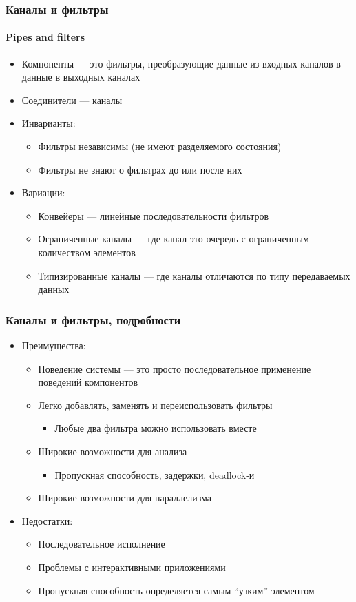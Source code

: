\documentclass[xetex,mathserif,serif]{beamer}
\begin{document}
	\begin{frame}
		\frametitle{Каналы и фильтры}
		\framesubtitle{Pipes and filters}
		\begin{itemize}
			\item Компоненты --- это фильтры, преобразующие данные из входных каналов в данные в выходных каналах
			\item Соединители --- каналы
			\item Инварианты:
			\begin{itemize}
				\item Фильтры независимы (не имеют разделяемого состояния)
				\item Фильтры не знают о фильтрах до или после них
			\end{itemize}
			\item Вариации:
			\begin{itemize}
				\item Конвейеры --- линейные последовательности фильтров
				\item Ограниченные каналы --- где канал это очередь с ограниченным количеством элементов
				\item Типизированные каналы --- где каналы отличаются по типу передаваемых данных
			\end{itemize}
		\end{itemize}
	\end{frame}

	\begin{frame}
		\frametitle{Каналы и фильтры, подробности}
		\begin{itemize}
			\item Преимущества:
			\begin{itemize}
				\item Поведение системы --- это просто последовательное применение поведений компонентов
				\item Легко добавлять, заменять и переиспользовать фильтры
				\begin{itemize}
					\item Любые два фильтра можно использовать вместе
				\end{itemize}
				\item Широкие возможности для анализа
				\begin{itemize}
					\item Пропускная способность, задержки, deadlock-и
				\end{itemize}
				\item Широкие возможности для параллелизма
			\end{itemize}
			\item Недостатки:
			\begin{itemize}
				\item Последовательное исполнение
				\item Проблемы с интерактивными приложениями
				\item Пропускная способность определяется самым ``узким'' элементом
			\end{itemize}
		\end{itemize}
	\end{frame}
\end{document}

